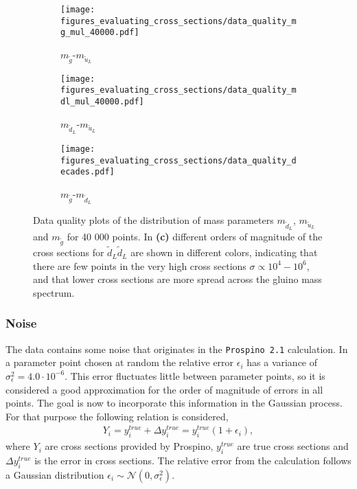 \documentclass[twoside,english]{uiofysmaster}
\begin{document}
\begin{figure}
    \centering
    \begin{subfigure}[b]{0.45\textwidth}
        \texttt{[image: figures\_evaluating\_cross\_sections/data\_quality\_mg\_mul\_40000.pdf]}
        \caption{$m_{\tilde{g}}$-$m_{\tilde{u}_L}$}
        \label{Fig:: evaluating cross : Data quality mgul}
    \end{subfigure}
    \begin{subfigure}[b]{0.45\textwidth}
        \texttt{[image: figures\_evaluating\_cross\_sections/data\_quality\_mdl\_mul\_40000.pdf]}
        \caption{$m_{\tilde{d}_L}$-$m_{\tilde{u}_L}$}
        \label{Fig:: evaluating cross : Data quality dlul}
    \end{subfigure}
    \begin{subfigure}[b]{0.75\textwidth}
        \centering
        \texttt{[image: figures\_evaluating\_cross\_sections/data\_quality\_decades.pdf]}
        \caption{$m_{\tilde{g}}$-$m_{\tilde{d}_L}$}
        \label{Fig:: evaluating cross : Data quality mgdl decades}
    \end{subfigure}
    \caption{Data quality plots of the distribution of mass parameters $m_{\tilde{d}_L}$, $m_{\tilde{u}_L}$ and $m_{\tilde{g}}$ for 40 000 points. In \textbf{(c)} different orders of magnitude of the cross sections for $\tilde{d}_L \tilde{d}_L$ are shown in different colors, indicating that there are few points in the very high cross sections $\sigma \propto 10^{4}-10^{6}$, and that lower cross sections are more spread across the gluino mass spectrum. }
    \label{Fig:: evaluating cross : Data quality}
\end{figure}

\subsubsection{Noise}\label{Sec:: evaluating cross : Noise in dataset}

The data contains some noise that originates in the \verb|Prospino 2.1| calculation. In a parameter point chosen at random the relative error $\epsilon_i$ has a variance of $\sigma^2_{\epsilon} = 4.0 \cdot 10^{-6}$. This error fluctuates little between parameter points, so it is considered a good approximation for the order of magnitude of errors in all points. The goal is now to incorporate this information in the Gaussian process. For that purpose the following relation is considered,
\begin{align}\label{Eq:: cross section w/ error}
Y_i = y^{true}_i + \Delta y^{true}_i = y_i^{true}(1 + \epsilon_i),
\end{align}
where $Y_i$ are cross sections provided by Prospino, $y_i^{true}$ are true cross sections and $\Delta y_i^{true}$ is the error in cross sections. The relative error from the calculation follows a Gaussian distribution $\epsilon_i \sim \mathcal{N}(0, \sigma_{\epsilon}^2)$. 
\end{document}
